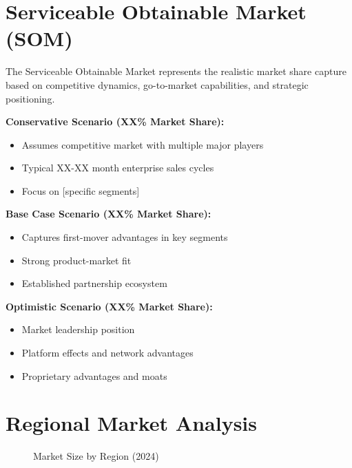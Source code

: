 \documentclass[11pt,letterpaper]{report}
\begin{document}
\section{Serviceable Obtainable Market (SOM)}

The Serviceable Obtainable Market represents the realistic market share capture based on competitive dynamics, go-to-market capabilities, and strategic positioning.

\begin{keyinsightbox}
\textbf{Conservative Scenario (XX\% Market Share):} 
\begin{itemize}
    \item Assumes competitive market with multiple major players
    \item Typical XX-XX month enterprise sales cycles
    \item Focus on [specific segments]
\end{itemize}

\textbf{Base Case Scenario (XX\% Market Share):} 
\begin{itemize}
    \item Captures first-mover advantages in key segments
    \item Strong product-market fit
    \item Established partnership ecosystem
\end{itemize}

\textbf{Optimistic Scenario (XX\% Market Share):} 
\begin{itemize}
    \item Market leadership position
    \item Platform effects and network advantages
    \item Proprietary advantages and moats
\end{itemize}
\end{keyinsightbox}

\section{Regional Market Analysis}


\begin{figure}[htbp]
\centering
\caption{Market Size by Region (2024)}
\label{fig:regional_breakdown}
\end{figure}
\end{document}
